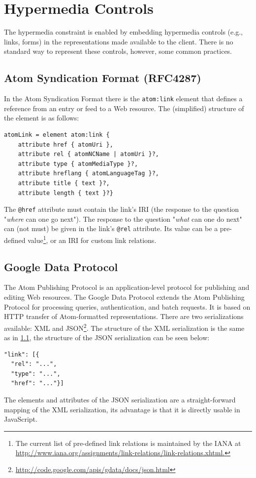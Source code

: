 \documentclass{acm_proc_article-sp}
\begin{document}
\section{Hypermedia Controls}\label{sec:currenthateoas}
The hypermedia constraint is enabled by embedding hypermedia controls (e.g., links, forms) in the representations made available to the client. There is no standard way to represent these controls, however, some common practices.

\subsection{Atom Syndication Format (RFC4287)}\label{sec:atom}
In the Atom Syndication Format \cite{Atom:Synd} there is the \texttt{atom:link} element that defines a reference from an entry or feed to a Web resource. The (simplified) structure of the element is as follows:
\begin{lstlisting}
atomLink = element atom:link {
    attribute href { atomUri },
    attribute rel { atomNCName | atomUri }?,
    attribute type { atomMediaType }?,
    attribute hreflang { atomLanguageTag }?,
    attribute title { text }?,
    attribute length { text }?}
\end{lstlisting}
The \texttt{@href} attribute must contain the link's IRI (the response to the question "\textit{where} can one go next"). The response to the question "\textit{what} can one do next" can (not must) be given in the link's \texttt{@rel} attribute. Its value can be a pre-defined value\footnote{The current list of pre-defined link relations is maintained by the IANA at \url{http://www.iana.org/assignments/link-relations/link-relations.xhtml.}}, or an IRI for custom link relations.

\subsection{Google Data Protocol}\label{sec:gdata}
The Atom Publishing Protocol\cite{Atom:Pub} is an application-level protocol for publishing and editing Web resources. The Google Data Protocol\cite{Google:Data} extends the Atom Publishing Protocol for processing queries, authentication, and batch requests. It is based on HTTP transfer of Atom-formatted representations. There are two serializations available: XML and JSON\footnote{\url{http://code.google.com/apis/gdata/docs/json.html}}. The structure of the XML serialization is the same as in \ref{sec:atom}, the structure of the JSON serialization can be seen below:
\begin{lstlisting}
"link": [{
  "rel": "...",
  "type": "...",
  "href": "..."}]
\end{lstlisting}
The elements and attributes of the JSON serialization are a straight-forward mapping of the XML serialization, its advantage is that it is directly usable in JavaScript.
\end{document}
